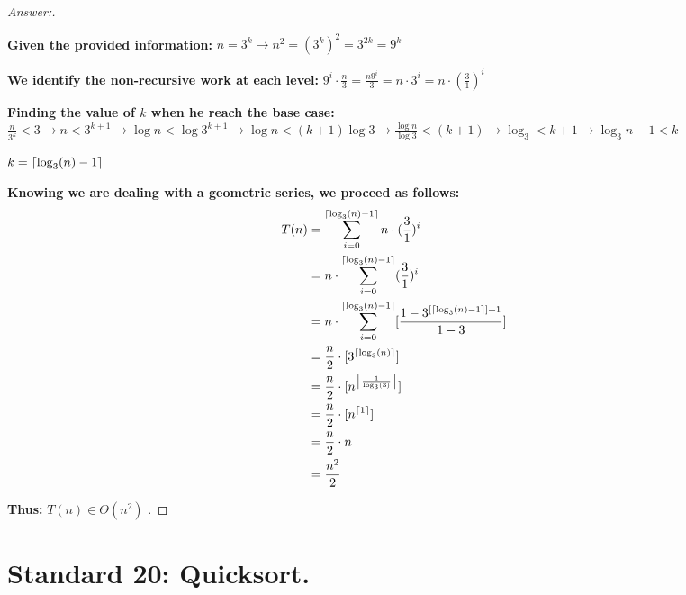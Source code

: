 \documentclass[11pt]{article}
\theoremstyle{definition}
\theoremstyle{definition}
\theoremstyle{definition}
\begin{document}
\begin{proof}[Answer:] \
\DeclarePairedDelimiter{\ceil}{\lceil}{\rceil}
\item \textbf{Given the provided information:} $n = 3^{k} \to n^{2} = (3^{k})^2 = 3^{2k} = 9^{k}$
\item \textbf{We identify the non-recursive work at each level:} $9^{i} \cdot \frac{n}{3} = \frac{n9^{i}}{3} = n \cdot 3^{i} = n \cdot (\frac{3}{1})^{i}$
\item \textbf{Finding the value of $k$ when he reach the base case:} \\
$\frac{n}{3^{k}} < 3 \to n < 3^{k + 1} \to \log n < \log 3^{k + 1} \to \log n < (k + 1) \log 3 \to \frac{\log n}{\log 3} < (k + 1) \to \log_3 < k + 1 \to \log_3 n - 1 < k$
\item $k = \ceil*{\log_3 (n) - 1}$
\item \textbf{Knowing we are dealing with a geometric series, we proceed as follows:}
\begin{align*}
T(n) &= \sum_{i = 0}^{\ceil*{\log_3 (n) - 1}} n \cdot (\frac{3}{1})^{i} \\
&= n \cdot \sum_{i = 0}^{\ceil*{\log_3 (n) - 1}} (\frac{3}{1})^{i} \\
&= n \cdot \sum_{i = 0}^{\ceil*{\log_3 (n) - 1}} [\frac{1 - 3^{[\ceil*{\log_3 (n) - 1}] + 1}}{1 - 3}] \\
&= \frac{n}{2} \cdot [3^{\ceil*{\log_3 (n)}}] \\
&= \frac{n}{2} \cdot [n^{\ceil*{\frac{1}{\log_3 (3)}}}] \\
&= \frac{n}{2} \cdot [n^{\ceil*{1}}] \\
&= \frac{n}{2} \cdot n \\
&= \frac{n^{2}}{2} \\
\end{align*}
\item \textbf{Thus:} \color{red} $T(n) \in \Theta(n^{2})$ \color{black}.
\end{proof}



\newpage
\section{Standard 20: Quicksort.}
\end{document}
